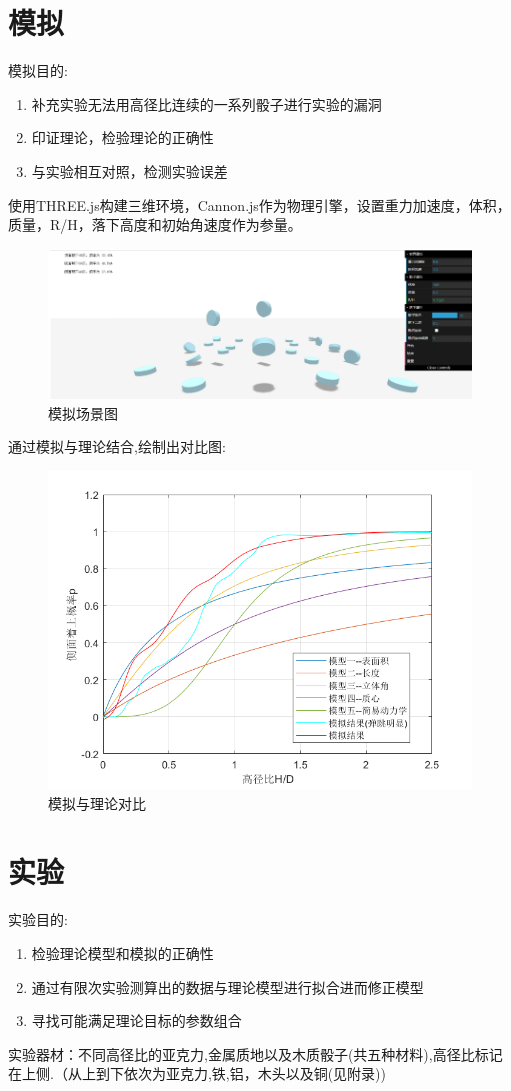 \documentclass[UTF8]{gapd}
\begin{document}
\section{模拟}
模拟目的:
\begin{enumerate}
	\item 补充实验无法用高径比连续的一系列骰子进行实验的漏洞
	\item 印证理论，检验理论的正确性
	\item 与实验相互对照，检测实验误差
\end{enumerate}
使用THREE.js构建三维环境，Cannon.js作为物理引擎，设置重力加速度，体积，质量，R/H，落下高度和初始角速度作为参量。
\begin{figure}[h]%
	\centering
	\includegraphics[width=0.8\columnwidth,height=0.15\textheight]{images/模拟场景}
	\caption{模拟场景图}
	\label{fig:P2}%
\end{figure}
通过模拟与理论结合,绘制出对比图:
\begin{figure}[h]%
	\centering
	\includegraphics[width=1.1\columnwidth]{images/实验理论对比}
	\caption{模拟与理论对比}
	\label{fig:P2}%
\end{figure}
\section{实验}
\label{sec:Experiment}
实验目的:
\begin{enumerate}
	\item 检验理论模型和模拟的正确性
	\item 通过有限次实验测算出的数据与理论模型进行拟合进而修正模型
	\item 寻找可能满足理论目标的参数组合
\end{enumerate}
实验器材：不同高径比的亚克力,金属质地以及木质骰子(共五种材料),高径比标记在上侧.（从上到下依次为亚克力,铁,铝，木头以及铜(见附录))
\end{document}
